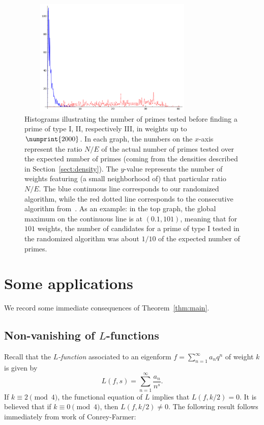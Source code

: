 \documentclass[11pt]{article}
\theoremstyle{plain}
\theoremstyle{definition}
\theoremstyle{remark}
\numberwithin{equation}{section}
\begin{document}
\begin{figure}[h]
\begin{center}
  \qquad
\includegraphics[width=3.6in, height=2.2in]{type3.png}
\end{center}
\caption{Histograms illustrating the number of primes tested before finding a
  prime of type I, II, respectively III, in weights up to $\numprint{2000}$.  
  In each graph, the numbers on the
$x$-axis represent the ratio $N/E$ of the actual number of primes tested over
the expected number of primes (coming from the densities described in
Section~\ref{sect:density}).  The $y$-value represents the number of weights
featuring (a small neighborhood of) that particular ratio $N/E$.  The blue 
continuous line corresponds to our randomized algorithm, while the red dotted 
line corresponds to the consecutive algorithm from~\cite{ConreyFarmer}.  
As an example: in the top graph, the global maximum on the continuous line is
at $(0.1, 101)$, meaning that for $101$ weights, the number of candidates for
a prime of type I tested in the randomized algorithm was about $1/10$ of the 
expected number of primes.}
\label{fig:histogram}
\end{figure}


\section{Some applications}
\label{sect:applications}

We record some immediate consequences of Theorem~\ref{thm:main}.

\subsection{Non-vanishing of $L$-functions}
Recall that the \emph{$L$-function} associated to an eigenform 
$f=\sum_{n=1}^\infty a_n q^n$ of weight $k$ is given by
\begin{equation*}
  L(f, s)=\sum_{n=1}^\infty \frac{a_n}{n^s}.
\end{equation*}
If $k\equiv 2\pmod{4}$, the functional equation of $L$ implies that
$L(f, k/2)=0$.  It is believed that if $k\equiv 0\pmod{4}$, then $L(f, k/2)\neq
0$.  The following result follows immediately from work of Conrey-Farmer: 
\end{document}
